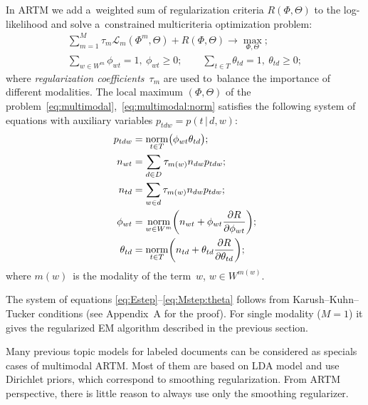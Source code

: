 \documentclass{acm_proc_article-sp}
\newcommand{\norm}{\mathop{\rm norm}\limits}
\newcommand{\cond}{\mspace{3mu}{|}\mspace{3mu}}
\newcommand{\cL}{\mathscr{L}}
\begin{document}
In ARTM we add a~weighted sum of regularization criteria $R(\Phi,\Theta)$ to the log-likelihood
and solve a~constrained multicriteria optimization problem:
\begin{gather}
\label{eq:multimodal}
    \sum_{m=1}^M \tau_m \cL_m (\Phi^m,\Theta)
    + R(\Phi,\Theta)
    \to \max_{\Phi,\Theta};
\\\label{eq:multimodal:norm}
    \sum_{w\in W^m}\!\!\! \phi_{wt} = 1,~
    \phi_{wt}\geq 0;
    \qquad
    \sum_{t\in T} \theta_{td} = 1,~
    \theta_{td}\geq 0;
\end{gather}
where \emph{regularization coefficients}~$\tau_m$
are used to~balance the importance of different modalities.
The local maximum $(\Phi,\Theta)$
of the problem~\eqref{eq:multimodal},~\eqref{eq:multimodal:norm}
satisfies the following system of equations
with auxiliary variables $p_{tdw} = p(t\cond d,w)$:
\begin{align}
    \label{eq:Estep}
    p_{tdw} &= \norm_{t\in T} \bigl(\phi_{wt}\theta_{td}\bigr);
\\\notag
    n_{wt} &= \sum_{d\in D} \tau_{m(w)} n_{dw} p_{tdw};
\\\notag
    n_{td} &= \sum_{w\in d} \tau_{m(w)} n_{dw} p_{tdw};
\\
    \label{eq:Mstep:phi}
    \phi_{wt} &= \norm_{w\in W^m}
        \biggl(
            n_{wt} + \phi_{wt} \frac{\partial R}{\partial \phi_{wt}}
        \biggr);
\\
    \label{eq:Mstep:theta}
    \theta_{td} &= \norm_{t\in T}
        \biggl(
            n_{td} + \theta_{td} \frac{\partial R}{\partial \theta_{td}}
        \biggr);
\end{align}
where $m(w)$~is the modality of the term~$w$,\; $w\in W^{m(w)}$.

The system of equations \eqref{eq:Estep}--\eqref{eq:Mstep:theta}
follows from Karush--Kuhn--Tucker conditions (see Appendix~A for the proof).
For single modality (${M=1}$) it gives the regularized EM algorithm
described in the previous section.

Many previous topic models for labeled documents
can be considered as specials cases of multimodal ARTM.
Most of them are based on LDA model and use Dirichlet priors,
which correspond to smoothing regularization.
From ARTM perspective,
there is little reason to always use only the smoothing regularizer.
\end{document}
